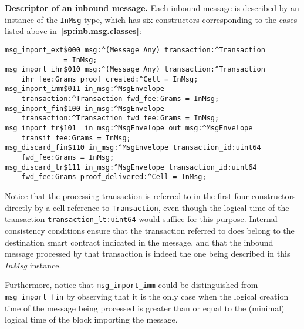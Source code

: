 \documentclass[12pt,oneside]{article}
\def\makepoint#1{\medbreak\noindent{\bf #1.\ }}
\def\nxsubpoint{\refstepcounter{subsubsection}%
  \smallbreak\makepoint{\thesubsubsection}}
\def\refpoint#1{{\rm\textbf{\ref{#1}}}}
\let\ptref=\refpoint
\def\emb#1{\textbf{#1.}}
\begin{document}
\nxsubpoint\label{sp:in.msg.d}\emb{Descriptor of an inbound message}
Each inbound message is described by an instance of the \texttt{InMsg} type, which has six constructors corresponding to the cases listed above in~\ptref{sp:inb.msg.classes}:
\begin{verbatim}
msg_import_ext$000 msg:^(Message Any) transaction:^Transaction 
              = InMsg;
msg_import_ihr$010 msg:^(Message Any) transaction:^Transaction 
    ihr_fee:Grams proof_created:^Cell = InMsg;
msg_import_imm$011 in_msg:^MsgEnvelope
    transaction:^Transaction fwd_fee:Grams = InMsg;
msg_import_fin$100 in_msg:^MsgEnvelope 
    transaction:^Transaction fwd_fee:Grams = InMsg;
msg_import_tr$101  in_msg:^MsgEnvelope out_msg:^MsgEnvelope 
    transit_fee:Grams = InMsg;
msg_discard_fin$110 in_msg:^MsgEnvelope transaction_id:uint64 
    fwd_fee:Grams = InMsg;
msg_discard_tr$111 in_msg:^MsgEnvelope transaction_id:uint64 
    fwd_fee:Grams proof_delivered:^Cell = InMsg;
\end{verbatim}
Notice that the processing transaction is referred to in the first four constructors directly by a cell reference to \texttt{Transaction}, even though the logical time of the transaction \texttt{transaction\_lt:uint64} would suffice for this purpose. Internal consistency conditions ensure that the transaction referred to does belong to the destination smart contract indicated in the message, and that the inbound message processed by that transaction is indeed the one being described in this {\em InMsg\/} instance.

Furthermore, notice that \texttt{msg\_import\_imm} could be distinguished from \texttt{msg\_import\_fin} by observing that it is the only case when the logical creation time of the message being processed is greater than or equal to the (minimal) logical time of the block importing the message.
\end{document}
